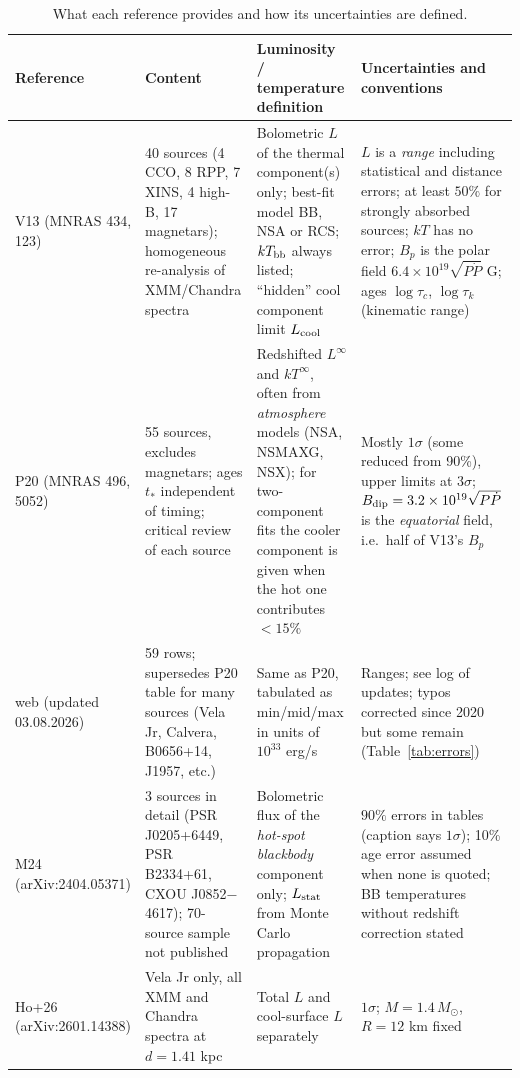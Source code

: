 \documentclass[11pt,a4paper]{article}
\begin{document}
\begin{table}[htbp]
\centering\small
\caption{What each reference provides and how its uncertainties are defined.}\label{tab:prov}
\begin{adjustbox}{max width=\textwidth}\begin{tabular}{P{2.2cm}P{3.2cm}P{4.0cm}P{5.3cm}}
\toprule
Reference & Content & Luminosity / temperature definition & Uncertainties and conventions \\
\midrule
V13 (MNRAS 434, 123) & 40 sources (4 CCO, 8 RPP, 7 XINS, 4 high-B, 17 magnetars); homogeneous re-analysis of XMM/Chandra spectra & Bolometric $L$ of the thermal component(s) only; best-fit model BB, NSA or RCS; $kT_{\rm bb}$ always listed; ``hidden'' cool component limit $L_{\rm cool}$ & $L$ is a \emph{range} including statistical and distance errors; at least $50\%$ for strongly absorbed sources; $kT$ has no error; $B_p$ is the polar field $6.4\times10^{19}\sqrt{P\dot P}$ G; ages $\log\tau_c$, $\log\tau_k$ (kinematic range) \\
P20 (MNRAS 496, 5052) & 55 sources, excludes magnetars; ages $t_*$ independent of timing; critical review of each source & Redshifted $L^\infty$ and $kT^\infty$, often from \emph{atmosphere} models (NSA, NSMAXG, NSX); for two-component fits the cooler component is given when the hot one contributes $<15\%$ & Mostly $1\sigma$ (some reduced from 90\%), upper limits at $3\sigma$; $B_{\rm dip}=3.2\times10^{19}\sqrt{P\dot P}$ is the \emph{equatorial} field, i.e.\ half of V13's $B_p$ \\
web (updated 03.08.2026) & 59 rows; supersedes P20 table for many sources (Vela Jr, Calvera, B0656+14, J1957, etc.) & Same as P20, tabulated as min/mid/max in units of $10^{33}$ erg/s & Ranges; see log of updates; typos corrected since 2020 but some remain (Table~\ref{tab:errors}) \\
M24 (arXiv:2404.05371) & 3 sources in detail (PSR J0205+6449, PSR B2334+61, CXOU J0852$-$4617); 70-source sample not published & Bolometric flux of the \emph{hot-spot blackbody} component only; $L_{\rm stat}$ from Monte Carlo propagation & $90\%$ errors in tables (caption says $1\sigma$); 10\% age error assumed when none is quoted; BB temperatures without redshift correction stated \\
Ho+26 (arXiv:2601.14388) & Vela Jr only, all XMM and Chandra spectra at $d=1.41$ kpc & Total $L$ and cool-surface $L$ separately & $1\sigma$; $M=1.4\,M_\odot$, $R=12$ km fixed \\
\bottomrule
\end{tabular}\end{adjustbox}
\end{table}
\end{document}
